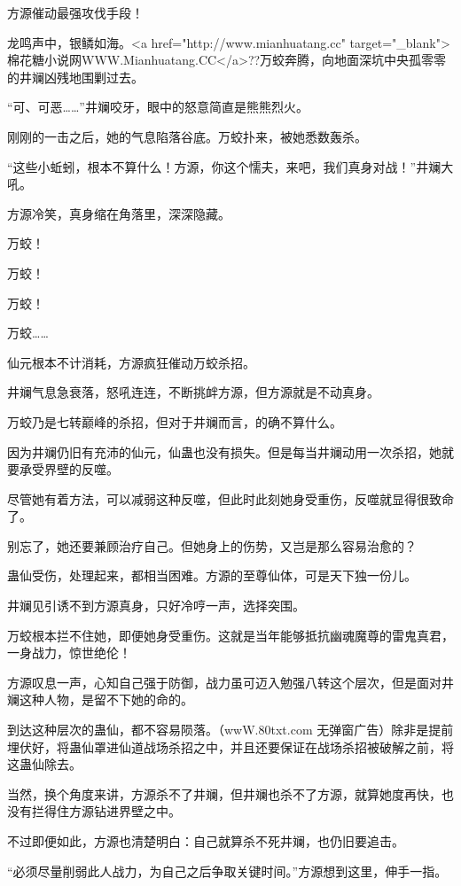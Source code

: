 
\begin{this_body}

方源催动最强攻伐手段！

龙鸣声中，银鳞如海。<a href="http://www.mianhuatang.cc" target="\_blank">棉花糖小说网WWW.Mianhuatang.CC</a>??万蛟奔腾，向地面深坑中央孤零零的井斓凶残地围剿过去。

“可、可恶……”井斓咬牙，眼中的怒意简直是熊熊烈火。

刚刚的一击之后，她的气息陷落谷底。万蛟扑来，被她悉数轰杀。

“这些小蚯蚓，根本不算什么！方源，你这个懦夫，来吧，我们真身对战！”井斓大吼。

方源冷笑，真身缩在角落里，深深隐藏。

万蛟！

万蛟！

万蛟！

万蛟……

仙元根本不计消耗，方源疯狂催动万蛟杀招。

井斓气息急衰落，怒吼连连，不断挑衅方源，但方源就是不动真身。

万蛟乃是七转巅峰的杀招，但对于井斓而言，的确不算什么。

因为井斓仍旧有充沛的仙元，仙蛊也没有损失。但是每当井斓动用一次杀招，她就要承受界壁的反噬。

尽管她有着方法，可以减弱这种反噬，但此时此刻她身受重伤，反噬就显得很致命了。

别忘了，她还要兼顾治疗自己。但她身上的伤势，又岂是那么容易治愈的？

蛊仙受伤，处理起来，都相当困难。方源的至尊仙体，可是天下独一份儿。

井斓见引诱不到方源真身，只好冷哼一声，选择突围。

万蛟根本拦不住她，即便她身受重伤。这就是当年能够抵抗幽魂魔尊的雷鬼真君，一身战力，惊世绝伦！

方源叹息一声，心知自己强于防御，战力虽可迈入勉强八转这个层次，但是面对井斓这种人物，是留不下她的命的。

到达这种层次的蛊仙，都不容易陨落。（wwW.80txt.com 无弹窗广告）除非是提前埋伏好，将蛊仙罩进仙道战场杀招之中，并且还要保证在战场杀招被破解之前，将这蛊仙除去。

当然，换个角度来讲，方源杀不了井斓，但井斓也杀不了方源，就算她度再快，也没有拦得住方源钻进界壁之中。

不过即便如此，方源也清楚明白：自己就算杀不死井斓，也仍旧要追击。

“必须尽量削弱此人战力，为自己之后争取关键时间。”方源想到这里，伸手一指。


\end{this_body}
